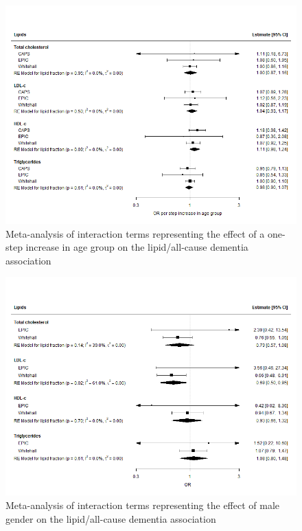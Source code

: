 \documentclass[a4paper, twoside]{templates/ociamthesis}
\begin{document}
\begin{figure}[H]
\includegraphics[width=1\linewidth]{figures/ipd/interaction_age_dementia} \caption[shortcap]{Meta-analysis of interaction terms representing the effect of a one-step increase in age group on the lipid/all-cause dementia association}\label{fig:interactionDementiaAge}
\end{figure}





\begin{figure}[H]
\includegraphics[width=1\linewidth]{figures/ipd/interaction_sex_dementia} \caption[shortcap]{Meta-analysis of interaction terms representing the effect of male gender on the lipid/all-cause dementia association}\label{fig:interactionDementiaSex}
\end{figure}
\end{document}
